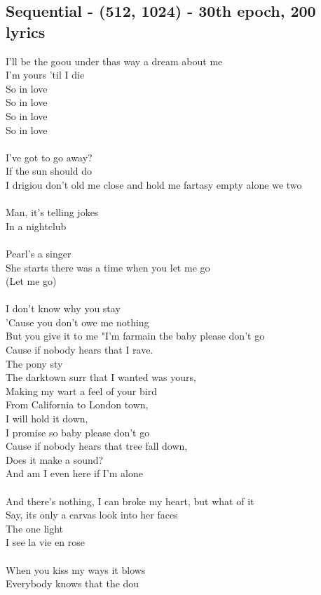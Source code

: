 \documentclass[conference]{IEEEtran}
\begin{document}
\subsection{Sequential - (512, 1024) - 30th epoch, 200 lyrics}\label{Sequential512_1024_200}
I'll be the goou under thas way a dream about me \\
I'm yours 'til I die \\
So in love \\
So in love \\
So in love \\
So in love \\
\\
I've got to go away? \\
If the sun should do \\
I drigiou don't old me close and hold me fartasy empty alone we two \\
\\
Man, it's telling jokes \\
In a nightclub \\
\\
Pearl's a singer \\
She starts there was a time when you let me go \\
(Let me go) \\
\\
I don't know why you stay \\
'Cause you don't owe me nothing \\
But you give it to me "I'm farmain the baby please don't go \\
Cause if nobody hears that I rave. \\
The pony sty \\
The darktown surr that I wanted was yours, \\
Making my wart a feel of your bird \\
From California to London town, \\
I will hold it down, \\
I promise so baby please don't go \\
Cause if nobody hears that tree fall down, \\
Does it make a sound? \\
And am I even here if I'm alone \\
\\
And there's nothing, I can broke my heart, but what of it \\
Say, its only a carvas look into her faces \\
The one light \\
I see la vie en rose \\
\\
When you kiss my ways it blows \\
Everybody knows that the dou \\
\end{document}

